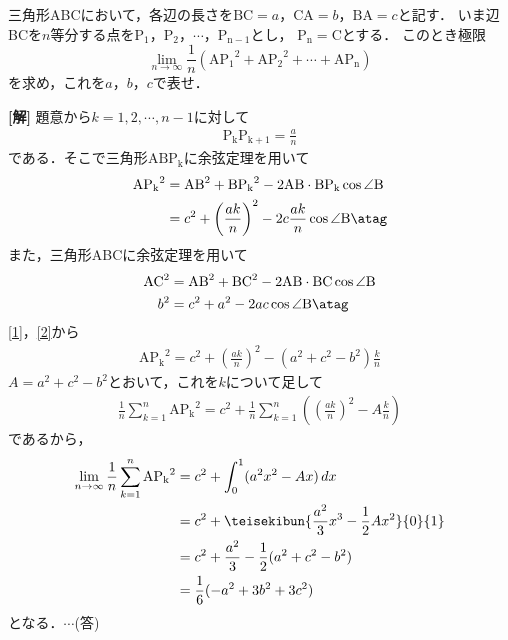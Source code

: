 \documentclass[a4j]{jarticle}
\begin{document}

\preEqlabel{$\cdots$}
     \begin{oframed}
     三角形ABCにおいて，各辺の長さを$\mathrm{BC}=a$，$\mathrm{CA}=b$，$\mathrm{BA}=c$と記す．
     いま辺BCを$n$等分する点を$\mathrm{P_1}$，$\mathrm{P_2}$，$\cdots$，$\mathrm{P_{n-1}}$とし，
     $\mathrm{P_n}=\mathrm{C}$とする．
     このとき極限
          \[\lim_{n\to\infty}\frac{1}{n}(\mathrm{AP_1}^2+\mathrm{AP_2}^2+\cdots+\mathrm{AP_n})\]
     を求め，これを$a$，$b$，$c$で表せ．
     \end{oframed}

\setlength{\columnseprule}{0.4pt}
\begin{multicols}{2}
{\bf[解]} 題意から$k=1,2,\cdots,n-1$に対して
      \begin{align*}
      \mathrm{P_kP_{k+1}}=\frac{a}{n}
      \end{align*}
である．そこで三角形$\mathrm{ABP_k}$に余弦定理を用いて
     \begin{align*}
     \mathrm{AP_k}^2&=\mathrm{AB}^2+\mathrm{BP_k}^2-2\mathrm{AB}\cdot\mathrm{BP_k}\cos \angle\mathrm{B} \\
     &=c^2+\left(\frac{ak}{n}\right)^2-2c\frac{ak}{n}\cos\angle\mathrm{B}\atag\label{1}
     \end{align*}
また，三角形ABCに余弦定理を用いて
     \begin{align*}
     \mathrm{AC}^2&=\mathrm{AB}^2+\mathrm{BC}^2-2\mathrm{AB}\cdot\mathrm{BC}\cos \angle\mathrm{B} \\
     b^2&=c^2+a^2-2ac\cos\angle\mathrm{B}\atag\label{2}
     \end{align*}
\eqref{1}，\eqref{2}から     
     \begin{align*}
      \mathrm{AP_k}^2=c^2+\left(\frac{ak}{n}\right)^2-(a^2+c^2-b^2)\frac{k}{n}
     \end{align*}
$A=a^2+c^2-b^2$とおいて，これを$k$について足して
     \begin{align*}
     \frac{1}{n}\sum_{k=1}^n\mathrm{AP_k}^2=c^2+\frac{1}{n}\sum_{k=1}^n\left(%
     \left(\frac{ak}{n}\right)^2-A\frac{k}{n}\right)
     \end{align*}
であるから，
     \begin{align*}
     \lim_{n\to\infty}\frac{1}{n}\sum_{k=1}^n\mathrm{AP_k}^2&= %
     c^2+\int_0^1(a^2x^2-Ax)\, dx \\
     &=c^2+\teisekibun{\frac{a^2}{3}x^3-\frac{1}{2}Ax^2}{0}{1} \\
     &=c^2+\frac{a^2}{3}-\frac{1}{2}(a^2+c^2-b^2) \\
     &=\frac{1}{6}(-a^2+3b^2+3c^2)
     \end{align*}
となる．$\cdots$(答)
\newpage
\end{multicols}
\end{document}
